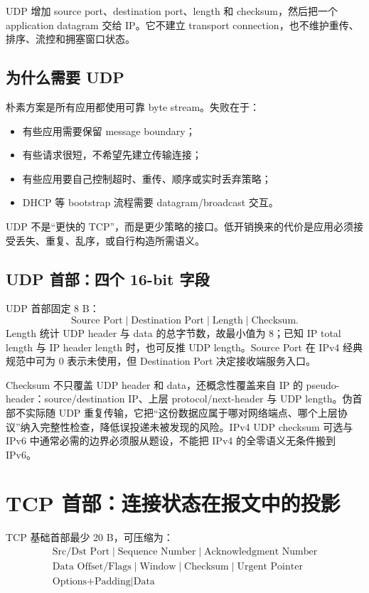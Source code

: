 \documentclass[UTF8,fontset=none,11pt,a4paper]{ctexart}
\providecommand{\tightlist}{\setlength{\itemsep}{0pt}\setlength{\parskip}{0pt}}
\begin{document}
UDP 增加 source port、destination port、length 和 checksum，然后把一个
application datagram 交给 IP。它不建立 transport
connection，也不维护重传、排序、流控和拥塞窗口状态。

\subsection{为什么需要
UDP}\label{31-ux4e3aux4ec0ux4e48ux9700ux8981-udp}

朴素方案是所有应用都使用可靠 byte stream。失败在于：

\begin{itemize}
\tightlist
\item
  有些应用需要保留 message boundary；
\item
  有些请求很短，不希望先建立传输连接；
\item
  有些应用要自己控制超时、重传、顺序或实时丢弃策略；
\item
  DHCP 等 bootstrap 流程需要 datagram/broadcast 交互。
\end{itemize}

UDP 不是``更快的
TCP''，而是更少策略的接口。低开销换来的代价是应用必须接受丢失、重复、乱序，或自行构造所需语义。

\subsection{UDP 首部：四个 16-bit 字段}

UDP 首部固定 8 B：
\[
\boxed{\text{Source Port}\mid\text{Destination Port}\mid\text{Length}\mid\text{Checksum}}.
\]
Length 统计 UDP header 与 data 的总字节数，故最小值为 8；已知 IP total length 与 IP header length 时，也可反推 UDP length。Source Port 在 IPv4 经典规范中可为 0 表示未使用，但 Destination Port 决定接收端服务入口。

Checksum 不只覆盖 UDP header 和 data，还概念性覆盖来自 IP 的 pseudo-header：source/destination IP、上层 protocol/next-header 与 UDP length。伪首部不实际随 UDP 重复传输，它把“这份数据应属于哪对网络端点、哪个上层协议”纳入完整性检查，降低误投递未被发现的风险。IPv4 UDP checksum 可选与 IPv6 中通常必需的边界必须服从题设，不能把 IPv4 的全零语义无条件搬到 IPv6。

\section{TCP 首部：连接状态在报文中的投影}

TCP 基础首部最少 20 B，可压缩为：
\[
\boxed{\begin{gathered}
\text{Src/Dst Port}\mid\text{Sequence Number}\mid\text{Acknowledgment Number}\\
\text{Data Offset/Flags}\mid\text{Window}\mid\text{Checksum}\mid\text{Urgent Pointer}\\
\text{Options+Padding}\mid\text{Data}
\end{gathered}}
\]
\end{document}
